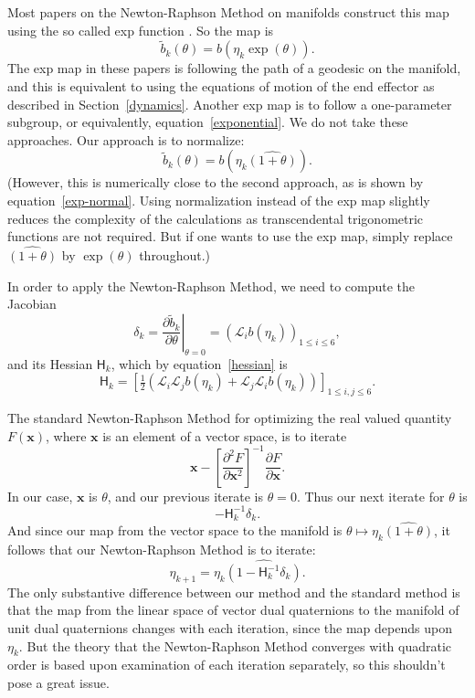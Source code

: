 \documentclass[reqno,12pt]{amsart}
\newcommand{\liederiv}{\mathcal L}
\begin{document}
Most papers on the Newton-Raphson Method on manifolds construct this map using the so called exp function \cite{dedieu-et-al,fernandes-et-al,ferreira-svaiter}.  So the map is
\begin{equation}
\tilde b_k(\theta) = b(\eta_k \exp(\theta)).
\end{equation}
The exp map in these papers is following the path of a geodesic on the manifold, and this is equivalent to using the equations of motion of the end effector as described in Section~\ref{dynamics}.  Another exp map is to follow a one-parameter subgroup, or equivalently, equation~\eqref{exponential}.  We do not take these approaches.  Our approach is to normalize:
\begin{equation}
\tilde b_k(\theta) = b(\eta_k  \widehat{(1 + \theta)}).
\end{equation}
(However, this is numerically close to the second approach, as is shown by equation~\eqref{exp-normal}.  Using normalization instead of the exp map slightly reduces the complexity of the calculations as transcendental trigonometric functions are not required.  But if one wants to use the exp map, simply replace $\widehat{(1+\theta)}$ by $\exp(\theta)$ throughout.)

In order to apply the Newton-Raphson Method, we need to compute the Jacobian
\begin{equation}
\label{jacobian}
\delta_k = \left.\frac{\partial\tilde b_k}{\partial\theta} \right|_{\theta = 0} = (\liederiv_i b(\eta_k))_{1 \le i \le 6},
\end{equation}
and its Hessian $\mathsf H_k$, which by equation~\eqref{hessian} is
\begin{equation}
\mathsf H_k
= \left[\tfrac12 (\liederiv_i \liederiv_j b(\eta_k) + \liederiv_j \liederiv_i b(\eta_k)) \right]_{1\le i,j\le 6}.
\end{equation}

The standard Newton-Raphson Method for optimizing the real valued quantity $F(\bm x)$, where $\bm x$ is an element of a vector space, is to iterate
\begin{equation}
\bm x - \left[\frac{\partial^2 F}{\partial \bm x^2}\right]^{-1} \frac{\partial F}{\partial \bm x} .
\end{equation}
In our case, $\bm x$ is $\theta$, and our previous iterate is $\theta = 0$.  Thus our next iterate for $\theta$ is
\begin{equation}
 - \mathsf H_k^{-1} \delta_k .
\end{equation}
And since our map from the vector space to the manifold is $\theta \mapsto \eta_k \widehat{(1+\theta)}$, it follows that our Newton-Raphson Method is to iterate:
\begin{equation}
\eta_{k+1} = \eta_k \widehat{(1 - \mathsf H_k^{-1} \delta_k)} .
\end{equation}
The only substantive difference between our method and the standard method is that the map from the linear space of vector dual quaternions to the manifold of unit dual quaternions changes with each iteration, since the map depends upon $\eta_k$.  But the theory that the Newton-Raphson Method converges with quadratic order is based upon examination of each iteration separately, so this shouldn't pose a great issue.
\end{document}
